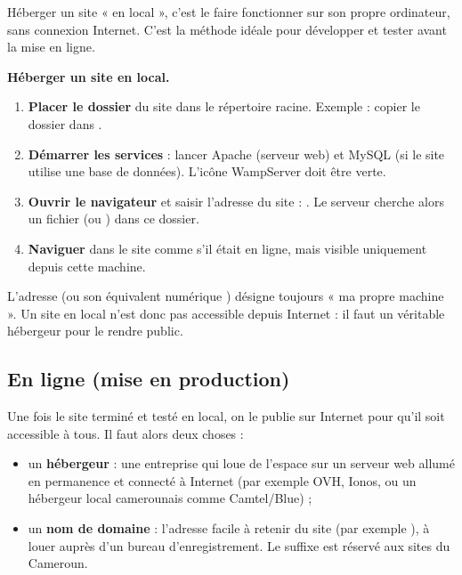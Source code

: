 Héberger un site « en local », c'est le faire fonctionner sur son propre ordinateur,
sans connexion Internet. C'est la méthode idéale pour développer et tester avant la
mise en ligne.

\begin{methode}
\textbf{Héberger un site en local.}
\begin{enumerate}[label=\arabic*)]
  \item \textbf{Placer le dossier} du site dans le répertoire racine. Exemple : copier
        le dossier  dans .
  \item \textbf{Démarrer les services} : lancer Apache (serveur web) et MySQL (si le
        site utilise une base de données). L'icône WampServer doit être verte.
  \item \textbf{Ouvrir le navigateur} et saisir l'adresse du site :
        . Le serveur cherche alors un fichier
         (ou ) dans ce dossier.
  \item \textbf{Naviguer} dans le site comme s'il était en ligne, mais visible
        uniquement depuis cette machine.
\end{enumerate}
\end{methode}

\begin{remarque}
L'adresse  (ou son équivalent numérique ) désigne
toujours « ma propre machine ». Un site en local n'est donc pas accessible depuis
Internet : il faut un véritable hébergeur pour le rendre public.
\end{remarque}

\subsection{En ligne (mise en production)}

Une fois le site terminé et testé en local, on le publie sur Internet pour qu'il soit
accessible à tous. Il faut alors deux choses :

\begin{itemize}
  \item un \textbf{hébergeur} : une entreprise qui loue de l'espace sur un serveur web
        allumé en permanence et connecté à Internet (par exemple OVH, Ionos, ou un
        hébergeur local camerounais comme Camtel/Blue) ;
  \item un \textbf{nom de domaine} : l'adresse facile à retenir du site (par exemple
        ), à louer auprès d'un bureau d'enregistrement. Le suffixe
         est réservé aux sites du Cameroun.
\end{itemize}


